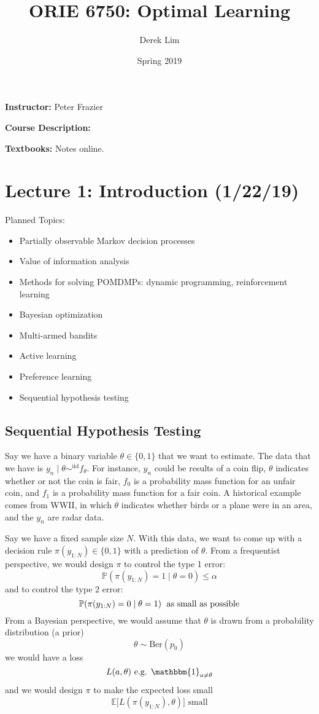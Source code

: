 \documentclass[pdftex,letterpaper,11pt]{article}
\theoremstyle{definition}
\theoremstyle{definition}
\theoremstyle{definition}
\newcommand{\ind}{\mathbbm{1}}
\newcommand{\PP}{\mathbb P}
\newcommand{\EE}{\mathbb E}
\newcommand{\mrm}[1]{\mathrm{#1}}
\begin{document}
\title{ORIE 6750: Optimal Learning}
\author{Derek Lim}
\date{Spring 2019}
\maketitle

\textbf{Instructor:} Peter Frazier

\textbf{Course Description:}

\textbf{Textbooks:} Notes online.

\section*{Lecture 1: Introduction (1/22/19)}

Planned Topics:
\begin{itemize}
	\item Partially observable Markov decision processes
	\item Value of information analysis
	\item Methods for solving POMDMPs: dynamic programming, reinforcement learning
	\item Bayesian optimization
	\item Multi-armed bandits
	\item Active learning
	\item Preference learning
	\item Sequential hypothesis testing
\end{itemize}

\subsection*{Sequential Hypothesis Testing}

Say we have a binary variable $\theta \in \{0,1\}$ that we want to estimate. The data that we have is $y_n \mid \theta \sim^{\mrm{iid}} f_\theta$. For instance, $y_n$ could be results of a coin flip, $\theta$ indicates whether or not the coin is fair, $f_0$ is a probability mass function for an unfair coin, and $f_1$ is a probability mass function for a fair coin. A historical example comes from WWII, in which $\theta$ indicates whether birds or a plane were in an area, and the $y_n$ are radar data.

Say we have a fixed sample size $N$. With this data, we want to come up with a decision rule $\pi(y_{1:N}) \in \{0,1\}$ with a prediction of $\theta$. From a frequentist perspective, we would design $\pi$ to control the type 1 error:
\[\PP(\pi(y_{1:N}) = 1 \mid \theta = 0) \leq \alpha\]
and to control the type 2 error:
\[\PP(\pi(y_{1:N}) = 0 \mid \theta = 1) \text{\; as small as possible}\]
From a Bayesian perspective, we would assume that $\theta$ is drawn from a probability distribution (a prior)
\[\theta \sim \mrm{Ber}(p_0)\]
we would have a loss
\[L(a,\theta) \text{ e.g. } \ind_{a \neq \theta}\]
and we would design $\pi$ to make the expected loss small
\[\EE\big[L(\pi(y_{1:N}), \theta)\big] \text{ small}\]
\end{document}

